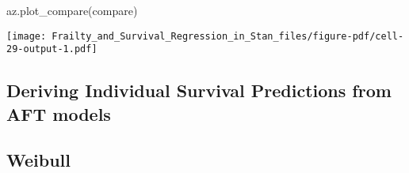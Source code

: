 \documentclass[
  letterpaper,
  DIV=11,
  numbers=noendperiod]{scrartcl}
\newenvironment{Shaded}{\begin{snugshade}}{\end{snugshade}}
\newcommand{\NormalTok}[1]{\textcolor[rgb]{0.00,0.23,0.31}{#1}}
\begin{document}
\begin{Shaded}
\begin{Highlighting}[]
\NormalTok{az.plot\_compare(compare)}
\end{Highlighting}
\end{Shaded}

\texttt{[image: Frailty\_and\_Survival\_Regression\_in\_Stan\_files/figure-pdf/cell-29-output-1.pdf]}

\subsection{Deriving Individual Survival Predictions from AFT
models}\label{deriving-individual-survival-predictions-from-aft-models}

\subsection{Weibull}\label{weibull}
\end{document}
